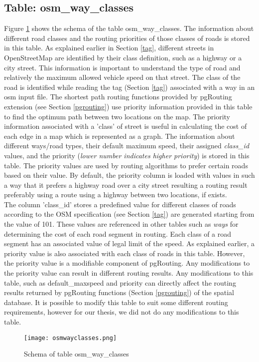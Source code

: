 \subsection{Table: osm{\_}way{\_}classes}
Figure \ref{fg:osmwayclasses} shows the schema of the table osm{\_}way{\_}classes. The information about different road classes and the routing priorities of those classes of roads is stored in this table. As explained earlier in Section \ref{tag}, different streets in OpenStreetMap are identified by their class definition, such as a highway or a city street. This information is important to understand the type of road and relatively the maximum allowed vehicle speed on that street. The class of the road is identified while reading the tag (Section \ref{tag}) associated with a way in an osm input file. The shortest path routing functions provided by pgRouting extension (see Section \ref{pgrouting}) use priority information provided in this table to find the optimum path between two locations on the map. The priority information associated with a 'class' of street is useful in calculating the cost of each edge in a map which is represented as a graph. The information about different ways/road types, their default maximum speed, their assigned \textit{class{\_}id} values, and the priority (\textit{lower number indicates higher priority}) is stored in this table. The priority values are used by routing algorithms to prefer certain roads based on their value. By default, the priority column is loaded with values in such a way that it prefers a highway road over a city street resulting a routing result preferably using a route using a highway between two locations, if exists. \\

The column 'class{\_}id' stores a predefined value for different classes of roads according to the OSM specification (see Section \ref{tag}) are generated starting from the value of 101. These values are referenced in other tables such as \textit{ways} for determining the cost of each road segment in routing. Each class of a road segment has an associated value of legal limit of the speed. As explained earlier, a priority value is also associated with each class of roads in this table. However, the priority value is a modifiable component of pgRouting. Any modifications to the priority value can result in different routing results. Any modifications to this table, such as default{\_}maxspeed and priority can directly affect the routing results returned by pgRouting functions (Section \ref{pgrouting}) of the spatial database. It is possible to modify this table to suit some different routing requirements, however for our thesis, we did not do any modifications to this table.  
\begin{figure}
\texttt{[image: osmwayclasses.png]}
\caption{Schema of table osm{\_}way{\_}classes}
\label{fg:osmwayclasses}
\end{figure}


